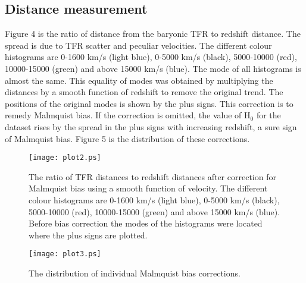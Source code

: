 \documentclass{article}
\begin{document}
\subsection{Distance measurement}
Figure 4
is the ratio of distance from the baryonic TFR to redshift distance. The spread is due to TFR scatter and peculiar velocities. The different colour histograms are  0-1600 km/s (light blue), 0-5000 km/s (black), 5000-10000 (red), 10000-15000 (green) and above 15000 km/s (blue). The mode of all histograms is almost the same. This equality of modes was obtained by multiplying the distances by a smooth function of redshift to remove the original trend. The positions of the original modes is shown by the plus signs. This correction is to remedy Malmquist bias. If the correction is omitted, the value of H$_0$ for the dataset rises by the spread in the plus signs with increasing redshift, a sure sign of Malmquist bias.
Figure 5 is the distribution of these corrections. 
\begin{figure}	
\texttt{[image: plot2.ps]}
\caption{The ratio of TFR distances to redshift distances after correction for Malmquist bias using a smooth function of velocity. The different colour histograms are  0-1600 km/s (light blue), 0-5000 km/s (black), 5000-10000 (red), 10000-15000 (green) and above 15000 km/s (blue). Before bias correction the modes of the histograms were located where the plus signs are plotted.}
\end{figure}

\begin{figure}	
\texttt{[image: plot3.ps]}
\caption{The distribution of individual Malmquist bias corrections.}
\end{figure}
\end{document}
